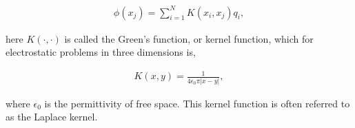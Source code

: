 \documentclass{IEEEcsmag}
\begin{document}
\begin{eqnarray}
	\phi(x_j) = \sum_{i=1}^{N} K(x_i, x_j) q_i,
\label{eq:sec:intro:nbody_problem}
\end{eqnarray}

here $K(\cdot, \cdot)$ is called the Green's function, or kernel function, which for electrostatic problems in three dimensions is,

\begin{eqnarray}
	K(x, y) = \frac{1}{4\epsilon_0\pi|x-y|},
\label{eq:sec:intro:laplace_kernel}
\end{eqnarray}

where $\epsilon_0$ is the permittivity of free space. This kernel function is often referred to as the Laplace kernel.





\end{document}
